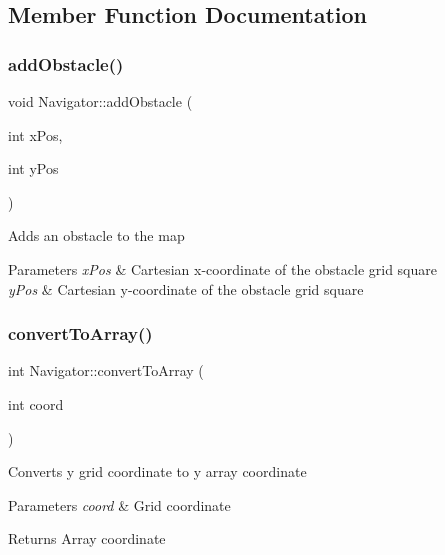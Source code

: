 \subsection{Member Function Documentation}
\mbox{\label{class_navigator_af5a35f0ae71309c1b276257709b24390}} 
\subsubsection{\texorpdfstring{add\+Obstacle()}{addObstacle()}}
{\footnotesize\ttfamily void Navigator\+::add\+Obstacle (\begin{DoxyParamCaption}\item[{int}]{x\+Pos,  }\item[{int}]{y\+Pos }\end{DoxyParamCaption})}

Adds an obstacle to the map


\begin{DoxyParams}{Parameters}
{\em x\+Pos} & Cartesian x-\/coordinate of the obstacle grid square \\
\hline
{\em y\+Pos} & Cartesian y-\/coordinate of the obstacle grid square \\
\hline
\end{DoxyParams}
\mbox{\label{class_navigator_a7a745d33cfa5cdfc551c87f3f23dc28e}} 
\subsubsection{\texorpdfstring{convert\+To\+Array()}{convertToArray()}}
{\footnotesize\ttfamily int Navigator\+::convert\+To\+Array (\begin{DoxyParamCaption}\item[{int}]{coord }\end{DoxyParamCaption})\hspace{0.3cm}{\ttfamily [private]}}

Converts y grid coordinate to y array coordinate


\begin{DoxyParams}{Parameters}
{\em coord} & Grid coordinate ~\newline
 \\
\hline
\end{DoxyParams}
\begin{DoxyReturn}{Returns}
Array coordinate 
\end{DoxyReturn}
\mbox{\label{class_navigator_a8b0cb171e3e3b16b206278fb23f624bc}} 
